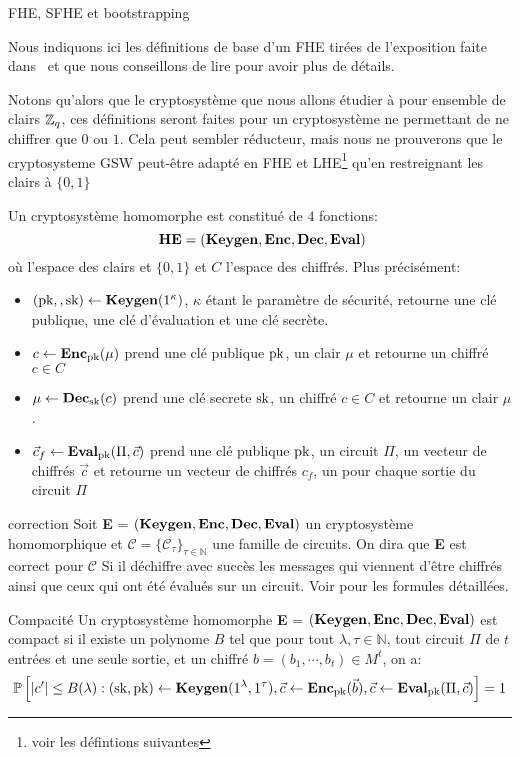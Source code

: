 \begin{section}{FHE, SFHE et bootstrapping}

Nous indiquons ici les définitions de base d'un FHE tirées de 
l'exposition faite dans~\cite{halevi} et que nous conseillons 
de lire pour avoir plus de détails.

\begin{definition}
Notons qu'alors que le cryptosystème que nous allons étudier à pour ensemble de clairs $\mathbb{Z}_q$, ces
définitions seront faites pour un cryptosystème ne permettant de ne chiffrer que $0$ ou $1$.
Cela peut sembler réducteur, mais nous ne prouverons que le  cryptosysteme
GSW peut-être adapté en FHE et LHE\footnote{voir les défintions suivantes} qu'en restreignant 
les clairs à $\{ 0, 1\}$


Un cryptosystème homomorphe est constitué de $4$ fonctions:
\[ \text{\textbf{HE}} = (\Keygen, \Enc, \Dec, \Eval)\]
où l'espace des clairs et $\{0,1\}$ et $C$ l'espace des chiffrés. 
Plus précisément:
\begin{itemize}
\item $(\text{pk},, \text{sk}) \leftarrow \text{\textbf{Keygen}}(1^\kappa)$, $\kappa$ étant le paramètre de sécurité, retourne une clé publique, une clé d'évaluation et une clé secrète.
\item $c \leftarrow \text{\textbf{Enc}}_{\text{pk}}(\mu)$ prend une clé publique $\text{pk}$, un clair $\mu$ et retourne un chiffré $c\in C$
\item $\mu \leftarrow \text{\textbf{Dec}}_{\text{sk}}(c)$ prend une clé secrete $\text{sk}$, un chiffré $c \in C$ et retourne un clair $\mu$.
\item $\vec{c}_f \leftarrow \text{\textbf{Eval}}_{\text{pk}}(\Pi,\vec{c})$ prend une clé publique
$\text{pk}$, un circuit  $\Pi$, un vecteur de chiffrés $\vec{c}$ et retourne un
vecteur de chiffrés $c_f$, un pour chaque sortie du circuit $\Pi$
\end{itemize}
\end{definition}

\begin{definition}{correction}
Soit \textbf{E} = $(\text{\textbf{Keygen}}, \text{\textbf{Enc}}, \text{\textbf{Dec}}, \text{\textbf{Eval}})$ un cryptosystème homomorphique
et  $\mathcal{C} = \{ \mathcal{C}_\tau\}_{\tau \in \mathbb{N}}$ une famille de
circuits.  On dira que \textbf{E} est correct pour $\mathcal{C}$
Si il déchiffre avec succès les messages qui viennent d'être chiffrés 
ainsi que ceux qui ont été évalués sur un circuit. Voir \cite{halevi} pour les
formules détaillées.
\end{definition}

\begin{definition}{Compacité}
Un cryptosystème homomorphe \textbf{E} = $(\text{\textbf{Keygen}}, \text{\textbf{Enc}}, \text{\textbf{Dec}}, \text{\textbf{Eval}})$ 
est compact si il existe un polynome $B$ tel que pour tout $\lambda, \tau
\in \mathbb{N}$, tout circuit $\Pi$ de $t$ entrées et une seule sortie, et un
chiffré $b = (b_1,\cdots,b_t) \in M^t$, on a:
\[ 
\mathbb{P} \left[ |c'| \leq B(\lambda): (\text{sk},\text{pk}) \leftarrow \text{\textbf{Keygen}}(1^\lambda,
1^\tau), \vec{c} \leftarrow \text{\textbf{Enc}}_{\text{pk}}(\vec{b}), \vec{c} \leftarrow 
\text{\textbf{Eval}}_{\text{pk}}(\Pi, \vec{c}) \right] = 1
\]
\end{definition}


\end{section}
